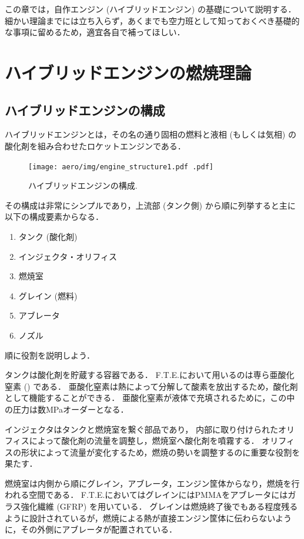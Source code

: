 \documentclass[uplatex,dvipdfmx,a4j,11pt]{jsreport}
\numberwithin{equation}{chapter}
\begin{document}
この章では，自作エンジン (ハイブリッドエンジン) の基礎について説明する．
細かい理論までには立ち入らず，あくまでも空力班として知っておくべき基礎的な事項に留めるため，適宜各自で補ってほしい．
\nocite{rocketPropulsionElements}
\section{ハイブリッドエンジンの燃焼理論}
\subsection{ハイブリッドエンジンの構成}
ハイブリッドエンジンとは，その名の通り固相の燃料と液相 (もしくは気相) の酸化剤を組み合わせたロケットエンジンである．
\begin{figure}
  \centering
  \texttt{[image: aero/img/engine\_structure1.pdf .pdf]}
  \caption{ハイブリッドエンジンの構成.}
  \label{fig:hybrid_engine}
\end{figure}
その構成は非常にシンプルであり，上流部 (タンク側) から順に列挙すると主に以下の構成要素からなる．
\begin{enumerate}
  \item タンク (酸化剤)
  \item インジェクタ・オリフィス
  \item 燃焼室
  \item グレイン (燃料) \footnotemark
  \item アブレータ
  \item ノズル
\end{enumerate}

順に役割を説明しよう．

タンクは酸化剤を貯蔵する容器である．
F.T.E.において用いるのは専ら亜酸化窒素 () である．
亜酸化窒素は熱によって分解して酸素を放出するため，酸化剤として機能することができる．
亜酸化窒素が液体で充填されるために，この中の圧力は数\unit{\mega\pascal}オーダーとなる．

インジェクタはタンクと燃焼室を繋ぐ部品であり，
内部に取り付けられたオリフィスによって酸化剤の流量を調整し，燃焼室へ酸化剤を噴霧する．
オリフィスの形状によって流量が変化するため，燃焼の勢いを調整するのに重要な役割を果たす．

燃焼室は内側から順にグレイン，アブレータ，エンジン筐体からなり，燃焼を行われる空間である．
F.T.E.においてはグレインにはPMMAをアブレータにはガラス強化繊維 (GFRP) を用いている．
グレインは燃焼終了後でもある程度残るように設計されているが，燃焼による熱が直接エンジン筐体に伝わらないように，その外側にアブレータが配置されている．
\end{document}
